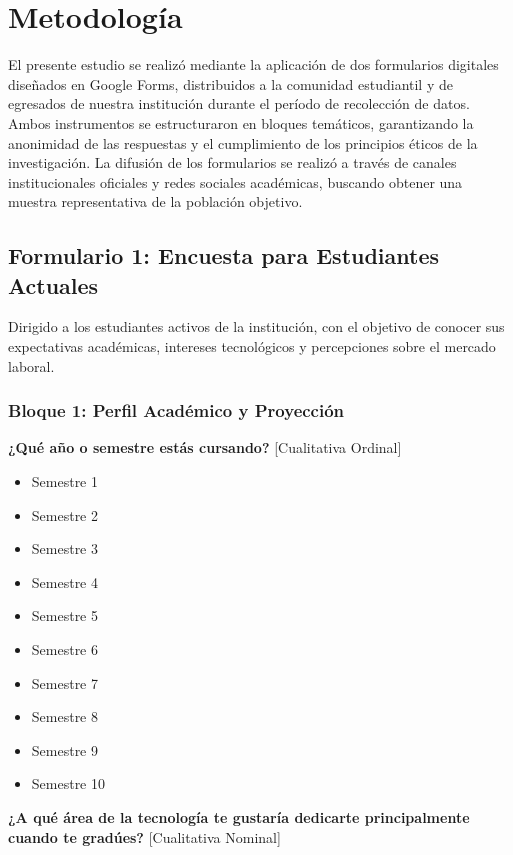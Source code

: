 \section{Metodología}

El presente estudio se realizó mediante la aplicación de dos formularios digitales diseñados en Google Forms, distribuidos a la comunidad estudiantil y de egresados de nuestra institución durante el período de recolección de datos. Ambos instrumentos se estructuraron en bloques temáticos, garantizando la anonimidad de las respuestas y el cumplimiento de los principios éticos de la investigación. La difusión de los formularios se realizó a través de canales institucionales oficiales y redes sociales académicas, buscando obtener una muestra representativa de la población objetivo.

\subsection{Formulario 1: Encuesta para Estudiantes Actuales}

Dirigido a los estudiantes activos de la institución, con el objetivo de conocer sus expectativas académicas, intereses tecnológicos y percepciones sobre el mercado laboral.

\subsubsection*{Bloque 1: Perfil Académico y Proyección}

\textbf{¿Qué año o semestre estás cursando?} [Cualitativa Ordinal]

\begin{itemize}
    \item Semestre 1
    \item Semestre 2
    \item Semestre 3
    \item Semestre 4
    \item Semestre 5
    \item Semestre 6
    \item Semestre 7
    \item Semestre 8
    \item Semestre 9
    \item Semestre 10
\end{itemize}

\textbf{¿A qué área de la tecnología te gustaría dedicarte principalmente cuando te gradúes?} [Cualitativa Nominal]

